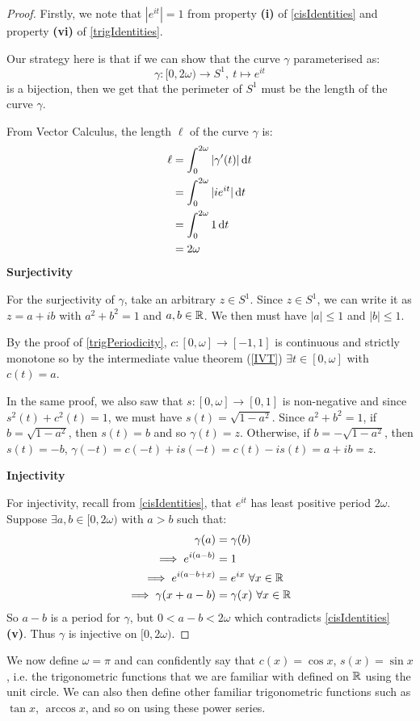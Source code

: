 \documentclass[../main.tex]{subfiles}
\begin{document}
\begin{proof}
  Firstly, we note that $|e^{it}| = 1$ from property \textbf{(i)} of \cref{cisIdentities} and property \textbf{(vi)} of \cref{trigIdentities}.

  Our strategy here is that if we can show that the curve $\gamma$ parameterised as:
  \[
    \gamma: [0, 2\omega) \to S^{1},\ t \mapsto e^{it}
  \]
  is a bijection, then we get that the perimeter of $S^{1}$ must be the length of the curve $\gamma$.

  From Vector Calculus, the length $\ell$ of the curve $\gamma$ is:
  \begin{align*}
    \ell &= \int_{0}^{2\omega} |\gamma'(t)| \d{t} \\
         &= \int_{0}^{2\omega} |ie^{it}| \d{t} \\
         &= \int_{0}^{2\omega} 1 \d{t} \\
         &= 2\omega
  \end{align*}
  \textbf{Surjectivity}\par
  For the surjectivity of $\gamma$, take an arbitrary $z \in S^{1}$.
  Since $z \in S^1$, we can write it as $z = a + ib$ with $a^2 + b^2 = 1$ and $a, b \in \mathbb{R}$.
  We then must have $|a| \leq 1$  and $|b| \leq 1$.

  By the proof of \cref{trigPeriodicity}, $c: [0, \omega] \to [-1, 1]$ is continuous and strictly monotone so by the intermediate value theorem (\cref{IVT}) $\exists t \in [0, \omega]$ with $c(t) = a$.

  In the same proof, we also saw that $s: [0, \omega] \to [0, 1]$ is non-negative and since $s^2(t) + c^2(t) = 1$, we must have $s(t) = \sqrt{1 - a^2}$.
  Since $a^2 + b^2 = 1$, if $b = \sqrt{1 - a^2}$, then $s(t) = b$ and so $\gamma(t) = z$.
  Otherwise, if $b = -\sqrt{1 - a^2}$, then $s(t) = -b$, $\gamma(-t) = c(-t) + is(-t) = c(t) - is(t) = a + ib = z$.

  \textbf{Injectivity}\par
  For injectivity, recall from \cref{cisIdentities}, that $e^{it}$ has least positive period $2\omega$.
  Suppose $\exists a, b \in [0, 2\omega)$ with $a > b$ such that:
  \begin{align*}
    \gamma(a) &= \gamma(b) \\
    \implies e^{i(a - b)} &= 1 \\
    \implies e^{i(a - b + x)} &= e^{ix}\ \forall x \in \mathbb{R} \\
    \implies \gamma(x + a - b) &= \gamma(x)\ \forall x \in \mathbb{R}
  \end{align*}
  So $a - b$ is a period for $\gamma$, but $0 < a - b < 2\omega$ which contradicts \cref{cisIdentities} \textbf{(v)}.
  Thus $\gamma$ is injective on $[0, 2\omega)$.
\end{proof}
We now define $\omega = \pi$ and can confidently say that $c(x) = \cos x$, $s(x) = \sin x$, i.e. the trigonometric functions that we are familiar with defined on $\mathbb{R}$ using the unit circle.
We can also then define other familiar trigonometric functions such as $\tan x$, $\arccos x$, and so on using these power series.
\end{document}
